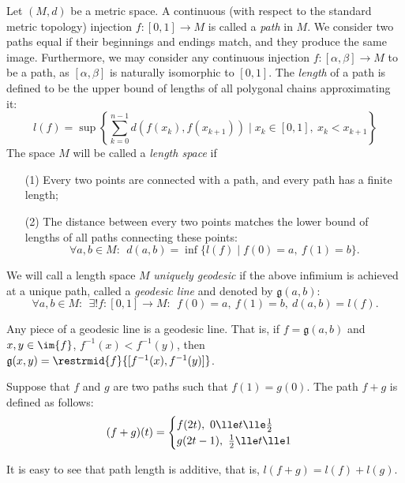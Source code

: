 \documentclass[12pt, a4paper]{article}
\newcommand{\g}{\mathfrak{g}}
\begin{document}
\begin{definition}\label{def-unigeo}
    Let \((M, d)\) be a metric space. A continuous (with respect to the standard metric topology) injection \(f \colon [0, 1] \to M\) is called a \textit{path} in \(M\). We consider two paths equal if their beginnings and endings match, and they produce the same image. Furthermore, we may consider any continuous injection \(f \colon [\alpha, \beta] \to M\) to be a path, as \([\alpha, \beta]\) is naturally isomorphic to \([0,1]\). The \textit{length} of a path is defined to be the upper bound of lengths of all polygonal chains approximating it: \[l(f) = \sup \left\{\sum_{k = 0}^{n-1} d(f(x_k), f(x_{k+1})) \mid x_k \in [0,1], \ x_k < x_{k+1}\right\}\] The space \(M\) will be called a \textit{length space} if

    \begin{itemize}
        \item[(1)] Every two points are connected with a path, and every path has a finite length;
        \item[(2)] The distance between every two points matches the lower bound of lengths of all paths connecting these points: \[\forall a, b \in M: \ \ d(a, b) = \inf \{l(f) \mid f(0) = a, \ f(1) = b\}.\]
    \end{itemize}

    We will call a length space \(M\) \textit{uniquely geodesic} if the above infimium is achieved at a unique path, called a \textit{geodesic line} and denoted by \(\g(a, b)\): \[\forall a, b \in M: \ \ \exists ! f \colon [0,1] \to M: \ \ f(0) = a, \ f(1) = b, \ d(a, b) = l(f).\]
\end{definition}

\begin{remark}\label{subgeodesic}
    Any piece of a geodesic line is a geodesic line. That is, if \(f = \g(a,b)\) and \(x, y \in \im{f}\), \(f^{-1}(x) < f^{-1}(y)\), then \(\g(x, y) = \restrmid{f}{[f^{-1}(x), f^{-1}(y)]}\).
\end{remark}

\begin{remark}
    Suppose that \(f\) and \(g\) are two paths such that \(f(1) = g(0)\). The path \(f+g\) is defined as follows: \[(f+g)(t) = \begin{cases}
        f(2t), \ 0 \lle t \lle \frac{1}{2} \\
        g(2t-1), \ \frac{1}{2} \lle t \lle 1
    \end{cases}\]

    \vspace{1.5mm}

    It is easy to see that path length is additive, that is, \(l(f+g) = l(f) + l(g)\).
\end{remark}
\end{document}
